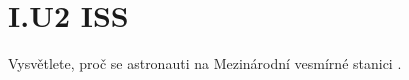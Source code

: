 \documentclass{../../../../style/mkimain}
\begin{document}
\section*{I.U2 ISS}
\noindent Vysvětlete, proč se astronauti na Mezinárodní vesmírné stanici .
\end{document}
